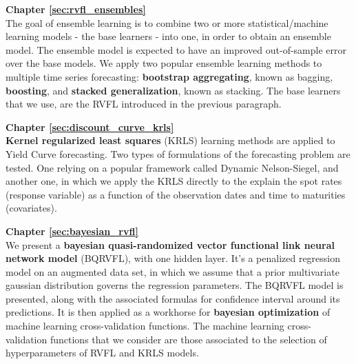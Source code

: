 \textbf{Chapter \ref{sec:rvfl_ensembles}} \\[0.2em]
The goal of ensemble learning is to combine two or more statistical/machine learning models - the base learners - into one, in order to obtain an ensemble model. The ensemble model is expected to have an improved out-of-sample error over the base models. We apply two popular ensemble learning methods to multiple time series forecasting: \textbf{bootstrap aggregating}, known as bagging, \textbf{boosting}, and \textbf{stacked generalization}, known as stacking. The base learners that we use, are the RVFL introduced in the previous paragraph.

\textbf{Chapter \ref{sec:discount_curve_krls}} \\[0.2em]
\textbf{Kernel regularized least squares} (KRLS) learning methods are applied to Yield Curve forecasting. Two types of formulations of the forecasting problem are tested. One relying on a popular framework called Dynamic Nelson-Siegel, and another one, in which we apply the KRLS directly to the explain the spot rates (response variable) as a function of the observation dates and time to maturities (covariates).

\textbf{Chapter \ref{sec:bayesian_rvfl}} \\[0.2em]
We present a \textbf{bayesian quasi-randomized vector functional link neural network model} (BQRVFL), with one hidden layer. It's a penalized regression model on an augmented data set, in which we assume that a prior multivariate gaussian distribution governs the regression parameters. The BQRVFL model is presented, along with the associated formulas for confidence interval around its predictions. It is then applied as a workhorse for \textbf{bayesian optimization} of machine learning cross-validation functions. The machine learning cross-validation functions that we consider are those associated to the selection of hyperparameters of RVFL and KRLS models.
